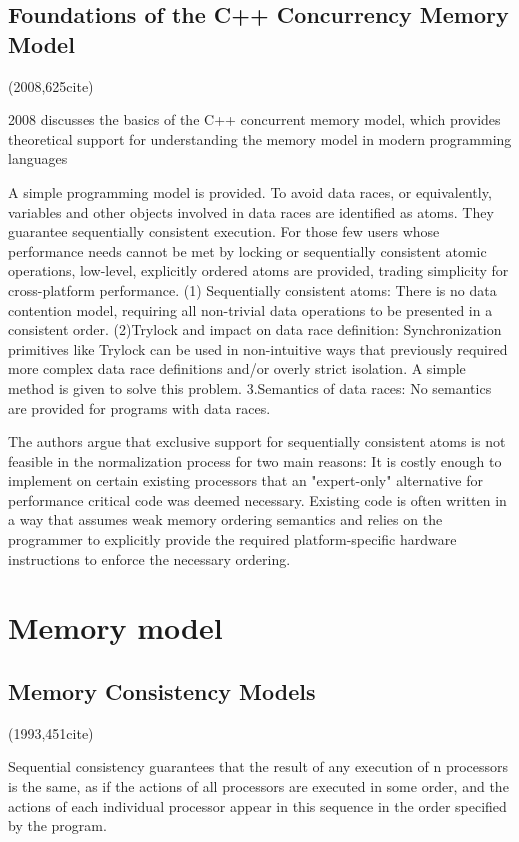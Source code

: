 \documentclass[a4paper,twoside]{scrbook}
\begin{document}
\subsection{Foundations of the C++ Concurrency Memory Model\cite{boehm2008foundations}}
(2008,625cite)\par
2008 discusses the basics of the C++ concurrent memory model, which provides theoretical support for understanding the memory model in modern programming languages
\par
A simple programming model is provided. To avoid data races, or equivalently, variables and other objects involved in data races are identified as atoms. They guarantee sequentially consistent execution.
For those few users whose performance needs cannot be met by locking or sequentially consistent atomic operations, low-level, explicitly ordered atoms are provided, trading simplicity for cross-platform performance.
(1) Sequentially consistent atoms: There is no data contention model, requiring all non-trivial data operations to be presented in a consistent order.
(2)Trylock and impact on data race definition: Synchronization primitives like Trylock can be used in non-intuitive ways that previously required more complex data race definitions and/or overly strict isolation. A simple method is given to solve this problem.
3.Semantics of data races: No semantics are provided for programs with data races.
\par
The authors argue that exclusive support for sequentially consistent atoms is not feasible in the normalization process for two main reasons:
It is costly enough to implement on certain existing processors that an "expert-only" alternative for performance critical code was deemed necessary.
Existing code is often written in a way that assumes weak memory ordering semantics and relies on the programmer to explicitly provide the required platform-specific hardware instructions to enforce the necessary ordering.
\section{Memory model}
\subsection{Memory Consistency Models\cite{mosberger1993memory}}
(1993,451cite)\par
Sequential consistency guarantees that the result of any execution of n processors is the same, as if the actions of all processors are executed in some order, and the actions of each individual processor appear in this sequence in the order specified by the program.
\end{document}
